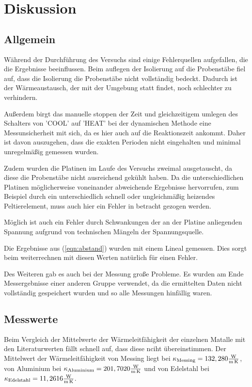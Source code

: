 \newpage
\section{Diskussion}
\subsection{Allgemein}
Während der Durchführung des Versuchs sind einige Fehlerquellen aufgefallen, die die Ergebnisse beeinflussen.
Beim auflegen der Isolierung auf die Probenstäbe fiel auf, dass die Isolierung die Probenstäbe nicht vollständig bedeckt.
Dadurch ist der Wärmeaustausch, der mit der Umgebung statt findet, noch schlechter zu verhindern.

\noindent Außerdem birgt das manuelle stoppen der Zeit und gleichzeitigem umlegen des Schalters von 'COOL' auf 'HEAT' bei der dynamischen Methode eine Messunsicherheit mit sich, 
da es hier auch auf die Reaktionszeit ankommt.
Daher ist davon auszugehen, dass die exakten Perioden nicht eingehalten und minimal unregelmäßig gemessen wurden.

\noindent Zudem wurden die Platinen im Laufe des Versuchs zweimal ausgetauscht, da diese die Probenstäbe nicht ausreichend gekühlt haben.
Da die unterschiedlichen Platinen möglicherweise voneinander abweichende Ergebnisse hervorrufen, 
zum Beispiel durch ein unterschiedlich schnell oder ungleichmäßig heizendes Peltierelement, muss auch hier ein Fehler in betracht gezogen werden.

\noindent Möglich ist auch ein Fehler durch Schwankungen der an der Platine anliegenden Spannung aufgrund von technischen Mängeln der Spannungsquelle.

\noindent Die Ergebnisse aus (\ref{eqn:abstand})
wurden mit einem Lineal gemessen. Dies sorgt beim weiterrechnen mit diesen Werten natürlich für einen Fehler.

\noindent
Des Weiteren gab es auch bei der Messung große Probleme.
Es wurden am Ende Messergebnisse einer anderen Gruppe verwendet, da die ermittelten Daten nicht vollständig gespeichert wurden und so alle Messungen hinfällig waren. 

\label{sec:Diskussion}

\subsection{Messwerte}
\noindent
Beim Vergleich der Mittelwerte der Wärmeleitfähigkeit der einzelnen Matalle mit den Literaturwerten fällt schnell auf, dass diese nciht übereinstimmen. Der Mittelwert der Wärmeleitfähigkeit von
Messing liegt bei $\kappa_\text{Messing} = 132,280 \si[per-mode=fraction]{\watt\per\meter\per\kelvin}$, von Aluminium bei $\kappa_\text{Aluminium} = 201,7020 \si[per-mode=fraction]{\watt\per\meter\per\kelvin}$
und von Edelstahl bei $\kappa_\text{Edelstahl} = 11,2616 \si[per-mode=fraction]{\watt\per\meter\per\kelvin}$. 

